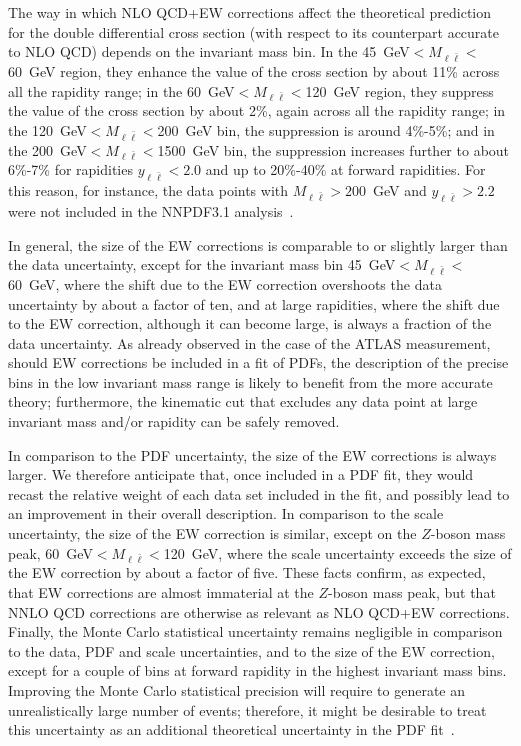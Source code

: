 The way in which NLO QCD+EW corrections affect the theoretical prediction for
the double differential cross section (with respect to its counterpart accurate
to NLO QCD) depends on the invariant mass bin. In the
45~GeV$<M_{\ell\bar\ell}<$60~GeV region, they enhance the value of the cross
section by about 11\% across all the rapidity range; in the
60~GeV$<M_{\ell\bar\ell}<$120~GeV region, they suppress the value of the cross
section by about 2\%, again across all the rapidity range; in the 
120~GeV$<M_{\ell\bar\ell}<$200~GeV bin, the suppression is around 4\%-5\%; and in
the 200~GeV$<M_{\ell\bar\ell}<$1500~GeV bin, the suppression increases further to
about 6\%-7\% for rapidities $y_{\ell\bar\ell}<2.0$ and up to 20\%-40\% at forward
rapidities. For this reason, for instance, the data points with
$M_{\ell\bar\ell}>200$~GeV and $y_{\ell\bar\ell}>2.2$ were not included in the
NNPDF3.1 analysis~\cite{Ball:2017nwa}.

In general, the size of the EW corrections is comparable to or slightly larger
than the data uncertainty, except for the invariant mass bin 
45~GeV$<M_{\ell\bar\ell}<$60~GeV, where the shift due to the EW correction
overshoots the data uncertainty by about a factor of ten, and at large
rapidities, where the shift due to the EW correction, although it can become
large, is always a fraction of the data uncertainty. As already observed in the
case of the ATLAS measurement, should EW corrections be included in a fit of
PDFs, the description of the precise bins in the low invariant mass range is
likely to benefit from the more accurate theory; furthermore, the kinematic cut
that excludes any data point at large invariant mass and/or rapidity can be
safely removed.

In comparison to the PDF uncertainty, the size of the EW corrections is always
larger. We therefore anticipate that, once included in a PDF fit, they would
recast the relative weight of each data set included in the fit, and possibly
lead to an improvement in their overall description. In comparison to the scale
uncertainty, the size of the EW correction is similar, except on the $Z$-boson
mass peak, 60~GeV$<M_{\ell\bar\ell}<$120~GeV, where the scale uncertainty exceeds
the size of the EW correction by about a factor of five. These facts confirm,
as expected, that EW corrections are almost immaterial at the $Z$-boson mass
peak, but that NNLO QCD corrections are otherwise as relevant as NLO QCD+EW
corrections. Finally, the Monte Carlo statistical uncertainty remains negligible
in comparison to the data, PDF and scale uncertainties, and to the size of the
EW correction, except for a couple of bins at forward rapidity in the highest
invariant mass bins. Improving the Monte Carlo statistical precision will
require to generate an unrealistically large number of events; therefore, it
might be desirable to treat this uncertainty as an additional theoretical
uncertainty in the PDF fit~\cite{Ball:2018lag}.


